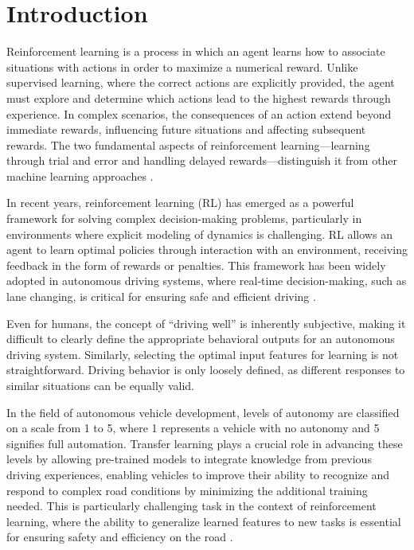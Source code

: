 
\chapter{Introduction}

\label{cha:introduction}

Reinforcement learning is a process in which an agent learns how to associate situations with actions in order to maximize a numerical reward. Unlike supervised learning, where the correct actions are explicitly provided, the agent must explore and determine which actions lead to the highest rewards through experience. In complex scenarios, the consequences of an action extend beyond immediate rewards, influencing future situations and affecting subsequent rewards. The two fundamental aspects of reinforcement learning—learning through trial and error and handling delayed rewards—distinguish it from other machine learning approaches \cite{Sutton2018}.

In recent years, reinforcement learning (RL) has emerged as a powerful framework for solving complex decision-making problems, particularly in environments where explicit modeling of dynamics is challenging. RL allows an agent to learn optimal policies through interaction with an environment, receiving feedback in the form of rewards or penalties. This framework has been widely adopted in autonomous driving systems, where real-time decision-making, such as lane changing, is critical for ensuring safe and efficient driving \cite{dpr_for_real_driving_systems}.

Even for humans, the concept of “driving well” is inherently subjective, making it difficult to clearly define the appropriate behavioral outputs for an autonomous driving system. Similarly, selecting the optimal input features for learning is not straightforward. Driving behavior is only loosely defined, as different responses to similar situations can be equally valid.

In the field of autonomous vehicle development, levels of autonomy are classified on a scale from 1 to 5, where 1 represents a vehicle with no autonomy and 5 signifies full automation. Transfer learning plays a crucial role in advancing these levels by allowing pre-trained models to integrate knowledge from previous driving experiences, enabling vehicles to improve their ability to recognize and respond to complex road conditions by minimizing the additional training needed. This is particularly challenging task in the context of reinforcement learning, where the ability to generalize learned features to new tasks is essential for ensuring safety and efficiency on the road \cite{tl_survery_2016}.

